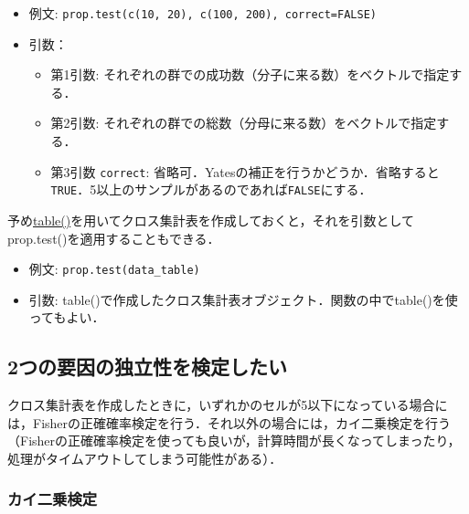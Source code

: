 \documentclass[
  xelatex, ja=standard]{bxjsarticle}
\providecommand{\tightlist}{%
  \setlength{\itemsep}{0pt}\setlength{\parskip}{0pt}}
\begin{document}
\begin{itemize}
\tightlist
\item
  例文: \texttt{prop.test(c(10,\ 20),\ c(100,\ 200),\ correct=FALSE)}
\item
  引数：

  \begin{itemize}
  \tightlist
  \item
    第1引数:
    それぞれの群での成功数（分子に来る数）をベクトルで指定する．
  \item
    第2引数: それぞれの群での総数（分母に来る数）をベクトルで指定する．
  \item
    第3引数 \texttt{correct}:
    省略可．Yatesの補正を行うかどうか．省略すると\texttt{TRUE}．5以上のサンプルがあるのであれば\texttt{FALSE}にする．
  \end{itemize}
\end{itemize}

予め\hyperref[ux5ea6ux6570ux5206ux5e03ux3092ux6c42ux3081ux308b]{table()}を用いてクロス集計表を作成しておくと，それを引数としてprop.test()を適用することもできる．

\begin{itemize}
\tightlist
\item
  例文: \texttt{prop.test(data\_table)}
\item
  引数:
  table()で作成したクロス集計表オブジェクト．関数の中でtable()を使ってもよい．
\end{itemize}

\subsection{2つの要因の独立性を検定したい}\label{ux3064ux306eux8981ux56e0ux306eux72ecux7acbux6027ux3092ux691cux5b9aux3057ux305fux3044}

クロス集計表を作成したときに，いずれかのセルが5以下になっている場合には，Fisherの正確確率検定を行う．それ以外の場合には，カイ二乗検定を行う（Fisherの正確確率検定を使っても良いが，計算時間が長くなってしまったり，処理がタイムアウトしてしまう可能性がある）．

\subsubsection{カイ二乗検定}\label{ux30abux30a4ux4e8cux4e57ux691cux5b9a}
\end{document}
